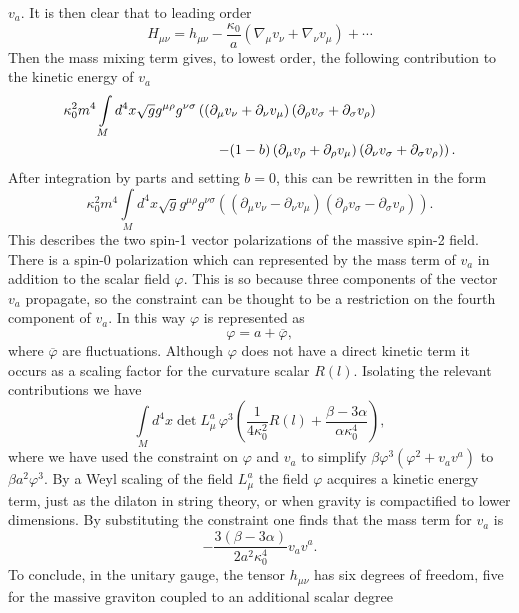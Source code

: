 \documentclass[a4paper,12pt]{article}
\begin{document}
$v_{a}.$ It is then clear that to leading order%
\[
H_{\mu\nu}=h_{\mu\nu}-\frac{\kappa_{0}}{a}\left(  \nabla_{\mu}v_{\nu}%
+\nabla_{\nu}v_{\mu}\right)  +\cdots
\]
Then the mass mixing term gives, to lowest order, the following contribution
to the kinetic energy of $v_{a}$%
\begin{align*}
&  \kappa_{0}^{2}m^{4}\int\limits_{M}d^{4}x\sqrt{g}g^{\mu\rho}g^{\nu\sigma
}\left(  \left(  \partial_{\mu}v_{\nu}+\partial_{\nu}v_{\mu}\right)  \left(
\partial_{\rho}v_{\sigma}+\partial_{\sigma}v_{\rho}\right)  \right.  \\
&  \hspace{1.5in}\left.  -(1-b)\left(  \partial_{\mu}v_{\rho}+\partial_{\rho
}v_{\mu}\right)  \left(  \partial_{\nu}v_{\sigma}+\partial_{\sigma}v_{\rho
}\right)  \right)  .
\end{align*}
After integration by parts and setting $b=0$, this can be rewritten in the
form
\[
\kappa_{0}^{2}m^{4}\int\limits_{M}d^{4}x\sqrt{g}g^{\mu\rho}g^{\nu\sigma
}\left(  \left(  \partial_{\mu}v_{\nu}-\partial_{\nu}v_{\mu}\right)  \left(
\partial_{\rho}v_{\sigma}-\partial_{\sigma}v_{\rho}\right)  \right)  .
\]
This describes the two spin-1 vector polarizations of the massive spin-2
field. There is a  spin-0 polarization which can represented by the mass term
of $v_{a}$ in addition to  the scalar field $\varphi.$ This  is so because
three components of the vector $v_{a}$ propagate, so the constraint can be
thought to be a restriction on the fourth component of $v_{a}.$ In this way
$\varphi$ is represented as
\[
\varphi=a+\overline{\varphi},
\]
where $\overline{\varphi}$ are fluctuations. Although $\varphi$ does not have
a direct kinetic term it occurs as a scaling factor for the curvature scalar
$R(l).$ Isolating the relevant contributions we have%
\[
\int\limits_{M}d^{4}x\det L_{\mu}^{a}\,\varphi^{3}\left(  \frac{1}{4\kappa
_{0}^{2}}R\left(  l\right)  +\frac{\beta-3\alpha}{\alpha\kappa_{0}^{4}%
}\right)  ,
\]
where we have used the constraint on $\varphi$ and $v_{a}$ to simplify
$\beta\varphi^{3}\left(  \varphi^{2}+v_{a}v^{a}\right)  $ to $\beta
a^{2}\varphi^{3}.$ By a Weyl scaling of the field $L_{\mu}^{a}$ the field
$\varphi$ acquires a kinetic energy term, just as the dilaton in string
theory, or when gravity is compactified to lower dimensions. By substituting
the constraint one finds that the mass term for $v_{a}$ is
\[
-\frac{3\left(  \beta-3\alpha\right)  }{2a^{2}\kappa_{0}^{4}}v_{a}v^{a}.
\]
To conclude, in the unitary gauge, the tensor $h_{\mu\nu}$ has six degrees of
freedom, five for the massive graviton coupled to an additional scalar degree
\end{document}
